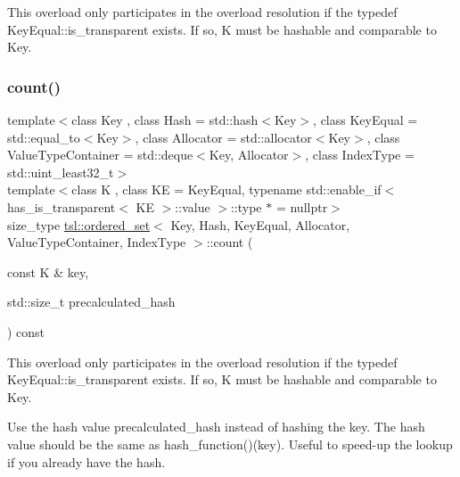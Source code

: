 This overload only participates in the overload resolution if the typedef Key\+Equal\+::is\+\_\+transparent exists. If so, K must be hashable and comparable to Key. \mbox{\label{classtsl_1_1ordered__set_aced79117d7534ed3ab2d6a237a0058bc}} 
\subsubsection{\texorpdfstring{count()}{count()}\hspace{0.1cm}{\footnotesize\ttfamily [3/3]}}
{\footnotesize\ttfamily template$<$class Key , class Hash  = std\+::hash$<$\+Key$>$, class Key\+Equal  = std\+::equal\+\_\+to$<$\+Key$>$, class Allocator  = std\+::allocator$<$\+Key$>$, class Value\+Type\+Container  = std\+::deque$<$\+Key, Allocator$>$, class Index\+Type  = std\+::uint\+\_\+least32\+\_\+t$>$ \\
template$<$class K , class KE  = Key\+Equal, typename std\+::enable\+\_\+if$<$ has\+\_\+is\+\_\+transparent$<$ K\+E $>$\+::value $>$\+::type $\ast$  = nullptr$>$ \\
size\+\_\+type \mbox{\hyperlink{classtsl_1_1ordered__set}{tsl\+::ordered\+\_\+set}}$<$ Key, Hash, Key\+Equal, Allocator, Value\+Type\+Container, Index\+Type $>$\+::count (\begin{DoxyParamCaption}\item[{const K \&}]{key,  }\item[{std\+::size\+\_\+t}]{precalculated\+\_\+hash }\end{DoxyParamCaption}) const\hspace{0.3cm}{\ttfamily [inline]}}





This overload only participates in the overload resolution if the typedef Key\+Equal\+::is\+\_\+transparent exists. If so, K must be hashable and comparable to Key.

Use the hash value \textquotesingle{}precalculated\+\_\+hash\textquotesingle{} instead of hashing the key. The hash value should be the same as hash\+\_\+function()(key). Useful to speed-\/up the lookup if you already have the hash. \mbox{\label{classtsl_1_1ordered__set_a3ec9980b152c71a875fc4a4e1d7bb78c}} 
